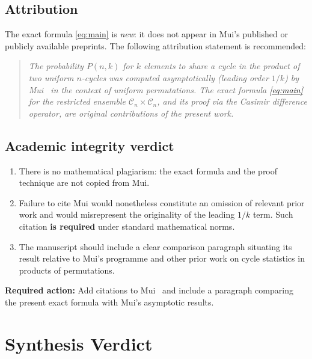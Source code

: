\documentclass[12pt, a4paper]{amsart}
\theoremstyle{plain}
\theoremstyle{definition}
\theoremstyle{remark}
\newcommand{\C}{\mathcal{C}}
\begin{document}
\subsection{Attribution}

The exact formula \eqref{eq:main} is \emph{new}: it does not appear in Mui's
published or publicly available preprints.  The following attribution statement
is recommended:

\begin{quotation}
\emph{The probability $P(n,k)$ for $k$ elements to share a cycle in the product
of two uniform $n$-cycles was computed asymptotically (leading order $1/k$) by
Mui~\cite{mui2} in the context of uniform permutations.  The exact formula
\eqref{eq:main} for the restricted ensemble $\C_n\times\C_n$, and its proof via
the Casimir difference operator, are original contributions of the present work.}
\end{quotation}

\subsection{Academic integrity verdict}

\begin{enumerate}
  \item There is no mathematical plagiarism: the exact formula and the proof
        technique are not copied from Mui.
  \item Failure to cite Mui would nonetheless constitute an omission of
        relevant prior work and would misrepresent the originality of the
        leading $1/k$ term.  Such citation \textbf{is required} under standard
        mathematical norms.
  \item The manuscript should include a clear comparison paragraph situating
        its result relative to Mui's programme and other prior work on cycle
        statistics in products of permutations.
\end{enumerate}

\textcolor{concern}{\textbf{Required action:}} Add citations to Mui~\cite{mui1,mui2}
and include a paragraph comparing the present exact formula with Mui's asymptotic
results.

\section{Synthesis Verdict}
\label{sec:verdict}
\end{document}
